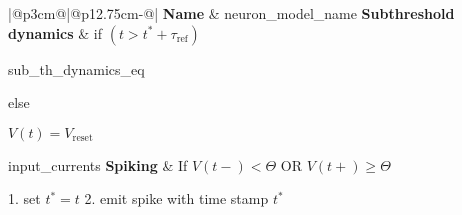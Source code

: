 \begin{table}[ph]
    \begin{tabular}{|@{\hspace*{1mm}}p{3cm}@{}|@{\hspace*{1mm}}p{12.75cm-\arrayrulewidth}@{\hspace*{1mm}}|}
        \hline
        \tabularnewline
        	    \hline
	    \textbf{Name} & {{ neuron_model_name }}\tabularnewline
	    \hline
	    \textbf{Subthreshold dynamics} & if $\left(t>t^{*}+\tau_{\mathrm{ref}}\right)$

	    \quad{}
	    {{ sub_th_dynamics_eq }}
	    \quad{}

	    else

	    \quad{} $V(t)=V_{\mathrm{reset}}$

	    \vspace{1mm}
	    \textrm{ {{ input_currents }} }
	    \tabularnewline
	    \hline
	    \textbf{Spiking} & If $V(t-)<\Theta$ OR $V(t+)\geq\Theta$

	    \hspace*{3mm}1. set $t^{*}=t$
	    \hspace*{3mm}2. emit spike with time stamp $t^{*}$\tabularnewline
	    \hline
	\end{tabular}


\end{table}



